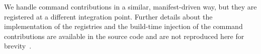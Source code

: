 

We handle command contributions in a similar, manifest-driven way, but they are registered at a different integration point.
Further details about the implementation of the registries and the build-time injection of the command contributions are available in the source code and are not reproduced here for brevity~\cite{ruider_xxnicksdaxxma-nick-ruider_2026}.